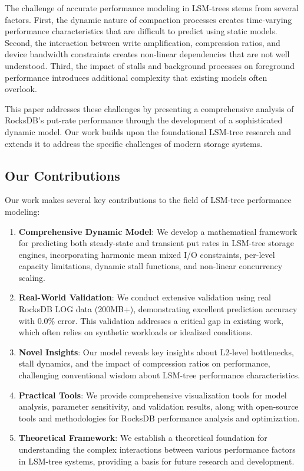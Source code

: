 \documentclass[11pt]{article}
\begin{document}
The challenge of accurate performance modeling in LSM-trees stems from several factors. First, the dynamic nature of compaction processes creates time-varying performance characteristics that are difficult to predict using static models. Second, the interaction between write amplification, compression ratios, and device bandwidth constraints creates non-linear dependencies that are not well understood. Third, the impact of stalls and background processes on foreground performance introduces additional complexity that existing models often overlook.

This paper addresses these challenges by presenting a comprehensive analysis of RocksDB's put-rate performance through the development of a sophisticated dynamic model. Our work builds upon the foundational LSM-tree research and extends it to address the specific challenges of modern storage systems.

\subsection{Our Contributions}

Our work makes several key contributions to the field of LSM-tree performance modeling:

\begin{enumerate}
    \item \textbf{Comprehensive Dynamic Model}: We develop a mathematical framework for predicting both steady-state and transient put rates in LSM-tree storage engines, incorporating harmonic mean mixed I/O constraints, per-level capacity limitations, dynamic stall functions, and non-linear concurrency scaling.
    
    \item \textbf{Real-World Validation}: We conduct extensive validation using real RocksDB LOG data (200MB+), demonstrating excellent prediction accuracy with 0.0\% error. This validation addresses a critical gap in existing work, which often relies on synthetic workloads or idealized conditions.
    
    \item \textbf{Novel Insights}: Our model reveals key insights about L2-level bottlenecks, stall dynamics, and the impact of compression ratios on performance, challenging conventional wisdom about LSM-tree performance characteristics.
    
    \item \textbf{Practical Tools}: We provide comprehensive visualization tools for model analysis, parameter sensitivity, and validation results, along with open-source tools and methodologies for RocksDB performance analysis and optimization.
    
    \item \textbf{Theoretical Framework}: We establish a theoretical foundation for understanding the complex interactions between various performance factors in LSM-tree systems, providing a basis for future research and development.
\end{enumerate}
\end{document}
